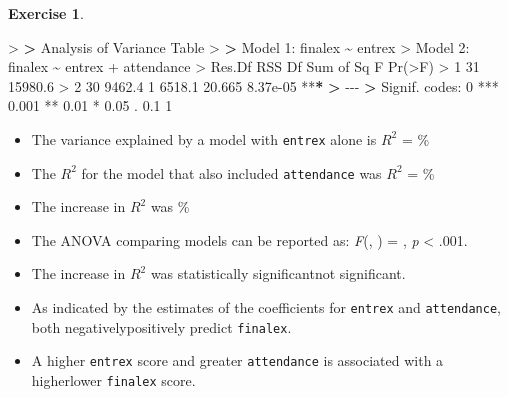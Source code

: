 \documentclass[
]{book}
\newenvironment{Shaded}{\begin{snugshade}}{\end{snugshade}}
\newcommand{\DecValTok}[1]{\textcolor[rgb]{0.00,0.00,0.81}{#1}}
\newcommand{\ErrorTok}[1]{\textcolor[rgb]{0.64,0.00,0.00}{\textbf{#1}}}
\newcommand{\FloatTok}[1]{\textcolor[rgb]{0.00,0.00,0.81}{#1}}
\newcommand{\FunctionTok}[1]{\textcolor[rgb]{0.00,0.00,0.00}{#1}}
\newcommand{\NormalTok}[1]{#1}
\newcommand{\SpecialCharTok}[1]{\textcolor[rgb]{0.00,0.00,0.00}{#1}}
\newcommand{\StringTok}[1]{\textcolor[rgb]{0.31,0.60,0.02}{#1}}
\theoremstyle{definition}
\theoremstyle{definition}
\theoremstyle{definition}
\newtheorem{exercise}{Exercise}[chapter]
\theoremstyle{definition}
\theoremstyle{remark}
\begin{document}
\begin{exercise}
\begin{Shaded}
\begin{Highlighting}[]
\SpecialCharTok{\textgreater{}} 
\ErrorTok{\textgreater{}}\NormalTok{ Analysis of Variance Table}
\SpecialCharTok{\textgreater{}} 
\ErrorTok{\textgreater{}}\NormalTok{ Model }\DecValTok{1}\SpecialCharTok{:}\NormalTok{ finalex }\SpecialCharTok{\textasciitilde{}}\NormalTok{ entrex}
\SpecialCharTok{\textgreater{}}\NormalTok{ Model }\DecValTok{2}\SpecialCharTok{:}\NormalTok{ finalex }\SpecialCharTok{\textasciitilde{}}\NormalTok{ entrex }\SpecialCharTok{+}\NormalTok{ attendance}
\SpecialCharTok{\textgreater{}}\NormalTok{   Res.Df     RSS Df Sum of Sq      F   }\FunctionTok{Pr}\NormalTok{(}\SpecialCharTok{\textgreater{}}\NormalTok{F)    }
\SpecialCharTok{\textgreater{}} \DecValTok{1}     \DecValTok{31} \FloatTok{15980.6}                                 
\SpecialCharTok{\textgreater{}} \DecValTok{2}     \DecValTok{30}  \FloatTok{9462.4}  \DecValTok{1}    \FloatTok{6518.1} \FloatTok{20.665} \FloatTok{8.37e{-}05} \SpecialCharTok{**}\ErrorTok{*}
\ErrorTok{\textgreater{}} \SpecialCharTok{{-}{-}{-}}
\ErrorTok{\textgreater{}}\NormalTok{ Signif. codes}\SpecialCharTok{:}  \DecValTok{0} \StringTok{\textquotesingle{}***\textquotesingle{}} \FloatTok{0.001} \StringTok{\textquotesingle{}**\textquotesingle{}} \FloatTok{0.01} \StringTok{\textquotesingle{}*\textquotesingle{}} \FloatTok{0.05} \StringTok{\textquotesingle{}.\textquotesingle{}} \FloatTok{0.1} \StringTok{\textquotesingle{} \textquotesingle{}} \DecValTok{1}
\end{Highlighting}
\end{Shaded}

\begin{itemize}
\item
  The variance explained by a model with \texttt{entrex} alone is \(R^2\) = \%
\item
  The \(R^2\) for the model that also included \texttt{attendance} was \(R^2\) = \%
\item
  The increase in \(R^2\) was \%
\item
  The ANOVA comparing models can be reported as: \emph{F}(, ) = , \emph{p} \textless{} .001.
\item
  The increase in \(R^2\) was statistically significantnot significant.
\item
  As indicated by the estimates of the coefficients for \texttt{entrex} and \texttt{attendance}, both negativelypositively predict \texttt{finalex}.
\item
  A higher \texttt{entrex} score and greater \texttt{attendance} is associated with a higherlower \texttt{finalex} score.
\end{itemize}

\end{exercise}
\end{document}
